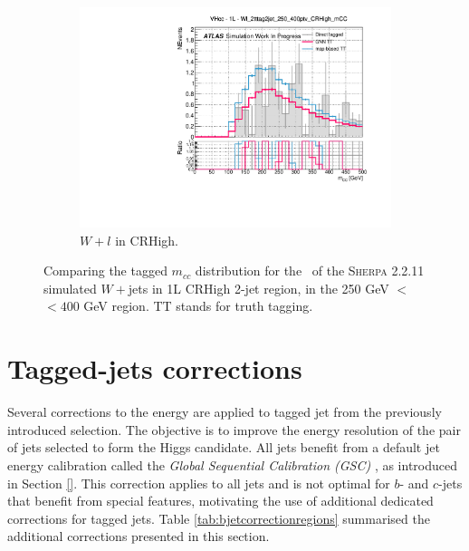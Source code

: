 \begin{figure}[h!]
\begin{subfigure}[b]{0.32\textwidth}
    \includegraphics[width=\textwidth]{Images/VH/Tagging/Wl_2tttag2jet_250_400ptv_CRHigh_mCC.pdf}
    \caption{$W+l$ in CRHigh.}
  \end{subfigure}
  \caption{Comparing the tagged $m_{cc}$ distribution for the \vhc\ of the \textsc{Sherpa} 2.2.11 simulated $W+$jets in 1L CRHigh 2-jet region, in the 250 GeV $<$ \ptv\ $< 400$ GeV region. TT stands for truth tagging.}
  \label{fig:truthtaggingW1LVHcc}
\end{figure} 

\section{Tagged-jets corrections}\label{sec-vh-jetcor}
Several corrections to the energy are applied to tagged jet from the previously introduced selection. The objective is to improve the energy resolution of the pair of jets selected to form the Higgs candidate. All jets benefit from a default jet energy calibration called the \textit{Global Sequential Calibration (GSC)} \cite{PhysRevD.96.072002}, as introduced in Section \ref{}. This correction applies to all jets and is not optimal for $b$- and $c$-jets that benefit from special features, motivating the use of additional dedicated corrections for tagged jets. Table \ref{tab:bjetcorrectionregions} summarised the additional corrections presented in this section. %

